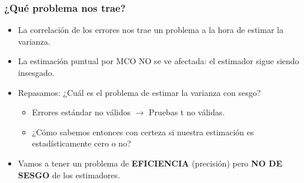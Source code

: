 \documentclass{beamer}
\begin{document}
\begin{frame}
\frametitle{¿Qué problema nos trae?}

\begin{itemize}
  \item La correlación de los errores nos trae un problema a la hora de estimar la varianza.
  \item La estimación puntual por MCO NO se ve afectada: el estimador sigue siendo insesgado.
  \item Repasamos: ¿Cuál es el problema de estimar la varianza con sesgo?
  \begin{itemize}
    \item Errores estándar no válidos \(\rightarrow\) Pruebas t no válidas.
    \item ¿Cómo sabemos entonces con certeza si nuestra estimación es estadísticamente cero o no?
  \end{itemize}
  \item Vamos a tener un problema de \textbf{EFICIENCIA} (precisión) pero \textbf{NO DE SESGO }de los estimadores.
\end{itemize}

\end{frame}
\end{document}
